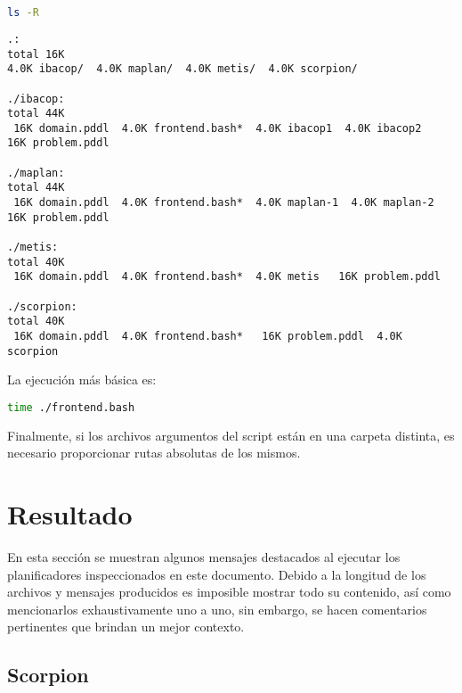 \documentclass[a4paper,12pt,twocolumn]{article}
\begin{document}
\begin{lstlisting}[language=sh]
  ls -R                                                                                                
\end{lstlisting}

\begin{lstlisting}[style=consola]
.:
total 16K
4.0K ibacop/  4.0K maplan/  4.0K metis/  4.0K scorpion/

./ibacop:
total 44K
 16K domain.pddl  4.0K frontend.bash*  4.0K ibacop1  4.0K ibacop2   16K problem.pddl

./maplan:
total 44K
 16K domain.pddl  4.0K frontend.bash*  4.0K maplan-1  4.0K maplan-2   16K problem.pddl

./metis:
total 40K
 16K domain.pddl  4.0K frontend.bash*  4.0K metis   16K problem.pddl

./scorpion:
total 40K
 16K domain.pddl  4.0K frontend.bash*   16K problem.pddl  4.0K scorpion
\end{lstlisting}

La ejecución más básica es:

\begin{lstlisting}[language=sh]
  time ./frontend.bash
\end{lstlisting}

Finalmente, si los archivos argumentos del script están en una carpeta distinta, es necesario proporcionar rutas absolutas de los mismos.
\section{Resultado}

En esta sección se muestran algunos mensajes destacados al ejecutar los planificadores inspeccionados en este documento. Debido a la longitud de los archivos y mensajes producidos es imposible mostrar todo su contenido, así como mencionarlos exhaustivamente uno a uno, sin embargo, se hacen comentarios pertinentes que brindan un mejor contexto.

\subsection{Scorpion}
\end{document}
